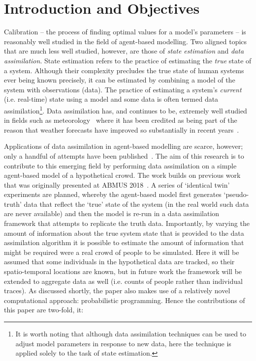 \documentclass[runningheads]{llncs}
\begin{document}
%
%
%
%

\section{Introduction and Objectives}

Calibration -- the process of finding optimal values for a model's parameters -- is reasonably well studied in the field of agent-based modelling. Two aligned topics that are much less well studied, however, are those of \textit{state estimation} and \textit{data assimilation}. State estimation refers to the practice of estimating the \textit{true} state of a system. Although their complexity precludes the true state of human systems ever being known precisely, it can be estimated by combining a model of the system with observations (data). The practice of estimating a system's \textit{current} (i.e. real-time) state using a model and some data is often termed data assimilation\footnote{It is worth noting that although data assimilation techniques can be used to adjust model parameters in response to new data, here the technique is applied solely to the task of state estimation.}.  Data assimilation has, and continues to be, extremely well studied in fields such as meteorology~\cite{kalnay_atmospheric_2003} where it has been credited as being part of the reason that weather forecasts have improved so substantially in recent years~\cite{bauer_quiet_2015}. 

Applications of data assimilation in agent-based modelling are scarce, however; only a handful of attempts have been published~\cite{malleson_understanding_2018,wang_data_2015,ward_dynamic_2016}. The aim of this research is to contribute to this emerging field by performing data assimilation on a simple agent-based model of a hypothetical crowd. The work builds on previous work that was originally presented at ABMUS 2018~\cite{malleson_understanding_2018}. A series of `identical twin' experiments are planned, whereby the agent-based model first generates `pseudo-truth' data that reflect the `true' state of the system (in the real world such data are never available) and then the model is re-run in a data assimilation framework that attempts to replicate the truth data. Importantly, by varying the amount of information about the true system state that is provided to the data assimilation algorithm it is possible to estimate the amount of information that might be required were a real crowd of people to be simulated. Here it will be assumed that some individuals in the hypothetical data are tracked, so their spatio-temporal locations are known, but in future work the framework will be extended to aggregate data as well (i.e. counts of people rather than individual traces). As discussed shortly, the paper also makes use of a relatively novel computational approach: probabilistic programming. Hence the contributions of this paper are two-fold, it:
\end{document}
